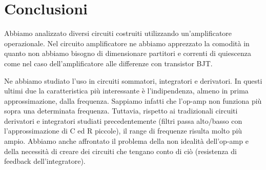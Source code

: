 \section{Conclusioni}

Abbiamo analizzato diversi circuiti costruiti utilizzando un'amplificatore operazionale. Nel circuito amplificatore ne abbiamo apprezzato la comodità in quanto non abbiamo bisogno di dimensionare partitori e correnti di quiescenza come nel caso dell'amplificatore alle differenze con transistor BJT. 

Ne abbiamo studiato l'uso in circuiti sommatori, integratori e derivatori.
In questi ultimi due la caratteristica più interessante è l'indipendenza, almeno in prima approssimazione, dalla frequenza.
Sappiamo infatti che l'op-amp non funziona più sopra una determinata frequenza.
Tuttavia, rispetto ai tradizionali circuiti derivatori e integratori studiati precedentemente (filtri passa alto/basso con l'approssimazione di C ed R piccole), il range di frequenze risulta molto più ampio.
Abbiamo anche affrontato il problema della non idealità dell'op-amp e della necessità di creare dei circuiti che tengano conto di ciò (resistenza di feedback dell'integratore).
